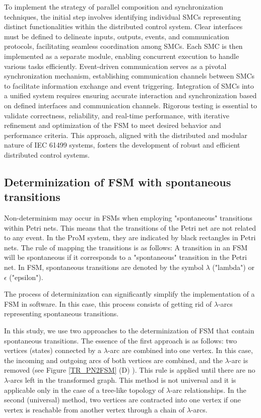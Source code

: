 \begin{bibunit}
To implement the strategy of parallel composition and synchronization techniques, the initial step involves identifying individual SMCs representing distinct functionalities within the distributed control system. Clear interfaces must be defined to delineate inputs, outputs, events, and communication protocols, facilitating seamless coordination among SMCs. Each SMC is then implemented as a separate module, enabling concurrent execution to handle various tasks efficiently. Event-driven communication serves as a pivotal synchronization mechanism, establishing communication channels between SMCs to facilitate information exchange and event triggering. Integration of SMCs into a unified system requires ensuring accurate interaction and synchronization based on defined interfaces and communication channels. Rigorous testing is essential to validate correctness, reliability, and real-time performance, with iterative refinement and optimization of the FSM to meet desired behavior and performance criteria. This approach, aligned with the distributed and modular nature of IEC 61499 systems, fosters the development of robust and efficient distributed control systems.

\subsection{Determinization of FSM with spontaneous transitions}

Non-determinism may occur in FSMs when employing "spontaneous" transitions within Petri nets. This means that the transitions of the Petri net are not related to any event. In the ProM system, they are indicated by black rectangles in Petri nets. The rule of mapping the transitions is as follows: A transition in an FSM  will be spontaneous if it corresponds to a "spontaneous" transition in the Petri net. In FSM, spontaneous transitions are denoted by the symbol $\lambda$  ("lambda")  or  $\epsilon$ ("epsilon").

The process of determinization can significantly simplify the implementation of a FSM in software. In this case, this process consists of getting rid of $\lambda$-arcs representing spontaneous transitions.


In this study, we use two approaches to the determinization of FSM that contain spontaneous transitions. The essence of the first approach is as follows: two vertices (states) connected by a $\lambda$-arc are combined into one vertex. In this case, the incoming and outgoing arcs of both vertices are combined, and the $\lambda$-arc is removed (see Figure \ref{TR_PN2FSM} (D) ). This rule is applied until there are no $\lambda$-arcs left in the transformed graph. This method is not universal and it is applicable only in the case of a tree-like topology of $\lambda$-arc relationships. In the second (universal) method, two vertices are contracted into one vertex if one vertex is reachable from another vertex through a chain of $\lambda$-arcs.



\end{bibunit}
